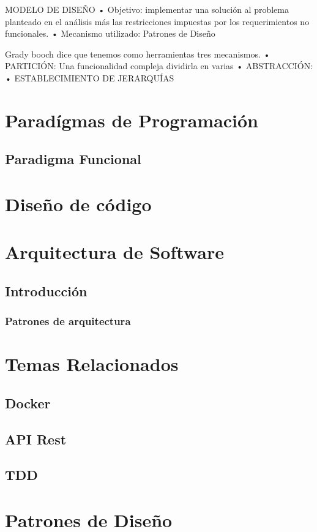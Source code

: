 \documentclass[12pt]{book}
\begin{document}
MODELO DE DISEÑO 
• Objetivo: implementar una solución al problema planteado en el análisis más las restricciones impuestas por los requerimientos no funcionales. 
• Mecanismo utilizado: Patrones de Diseño 


Grady booch dice que tenemos como herramientas tres mecanismos.
    • PARTICIÓN: Una funcionalidad compleja dividirla en varias 
    • ABSTRACCIÓN: 
    • ESTABLECIMIENTO DE JERARQUÍAS


\chapter{Parad\'igmas de Programaci\'on}
\section{Paradigma Funcional}


\chapter{Diseño de código}

\chapter{Arquitectura de Software}
\section{Introducción}
\subsection{Patrones de arquitectura}

\chapter{Temas Relacionados}
\section{Docker}
\section{API Rest}
\section{TDD}

\chapter{Patrones de Diseño}
\end{document}
